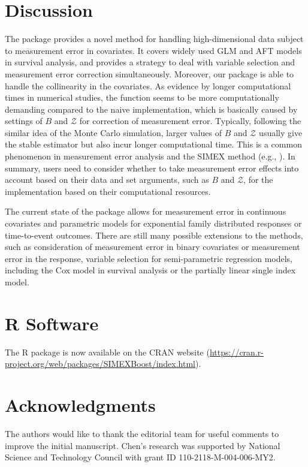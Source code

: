 
\section{Discussion}

The package  provides a novel {method for handling} high-dimensional data subject to measurement error in covariates. It covers widely used GLM and AFT models in survival analysis, and provides a  strategy to deal with variable selection and  measurement error correction simultaneously. Moreover, our package is able to handle the collinearity in the covariates. {As evidence by longer computational times in numerical studies, the function  seems to be more computationally demanding compared to the naive implementation, which is basically} caused by settings of $B$ and $\mathcal{Z}$ for correction of measurement error. Typically, following the similar idea of the Monte Carlo simulation, larger values of $B$ and $\mathcal{Z}$ usually give the stable estimator {but also incur} longer computational time. This is a common phenomenon in measurement error analysis and the SIMEX method (e.g., \citealp{Yi:2017}). {In summary, users need to consider whether to take measurement error effects into account based on their data and set arguments, such as $B$ and $\mathcal{Z}$, for the implementation based on their computational resources.}

The current {state of the package allows for} measurement error in continuous covariates and parametric models for exponential family distributed responses or time-to-event outcomes. There are still many {possible extensions to the methods}, such as consideration of measurement error in binary covariates or measurement error in the response, variable selection for semi-parametric regression models, including the Cox model in survival analysis or the partially linear single index model.


\section*{R Software}

The R package  is now available on the CRAN website (\url{https://cran.r-project.org/web/packages/SIMEXBoost/index.html}).


\section*{Acknowledgments}

The authors would like to thank the editorial team for useful comments to improve the initial manuscript.  Chen's research was supported by National Science and Technology Council with grant ID 110-2118-M-004-006-MY2.%



